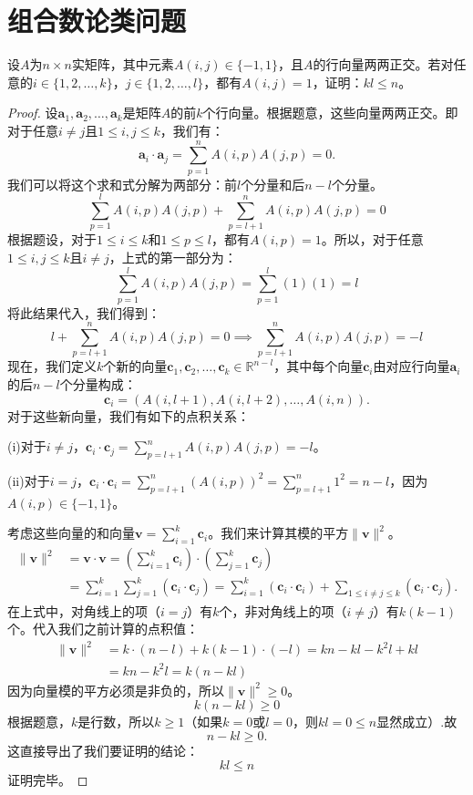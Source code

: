 \documentclass[../../main.tex]{subfiles}
\begin{document}
\section{组合数论类问题}

\begin{example}
设$A$为$n \times n$实矩阵，其中元素$A(i,j) \in \{-1,1\}$，且$A$的行向量两两正交。若对任意的$i \in \{1,2,\ldots,k\}$，$j \in \{1,2,\ldots,l\}$，都有$A(i,j) = 1$，证明：$kl \leqslant n$。
\end{example}
\begin{proof}
设$\mathbf{a}_1, \mathbf{a}_2, \ldots, \mathbf{a}_k$是矩阵$A$的前$k$个行向量。根据题意，这些向量两两正交。即对于任意$i \neq j$且$1 \leq i, j \leq k$，我们有：
\[
\mathbf{a}_i \cdot \mathbf{a}_j = \sum_{p=1}^n A(i, p)A(j, p) = 0.
\]
我们可以将这个求和式分解为两部分：前$l$个分量和后$n - l$个分量。
\[
\sum_{p=1}^l A(i, p)A(j, p) + \sum_{p=l+1}^n A(i, p)A(j, p) = 0 
\]
根据题设，对于$1 \leq i \leq k$和$1 \leq p \leq l$，都有$A(i, p) = 1$。所以，对于任意$1 \leq i, j \leq k$且$i \neq j$，上式的第一部分为：
\[
\sum_{p=1}^l A(i, p)A(j, p) = \sum_{p=1}^l (1)(1) = l 
\]
将此结果代入，我们得到：
\[
l + \sum_{p=l+1}^n A(i, p)A(j, p) = 0 \implies \sum_{p=l+1}^n A(i, p)A(j, p) = -l 
\]
现在，我们定义$k$个新的向量$\mathbf{c}_1, \mathbf{c}_2, \ldots, \mathbf{c}_k \in \mathbb{R}^{n - l}$，其中每个向量$\mathbf{c}_i$由对应行向量$\mathbf{a}_i$的后$n - l$个分量构成：
\[
\mathbf{c}_i = (A(i, l + 1), A(i, l + 2), \ldots, A(i, n)).
\]
对于这些新向量，我们有如下的点积关系：

(i)对于$i \neq j$，$\mathbf{c}_i \cdot \mathbf{c}_j = \sum_{p=l+1}^n A(i, p)A(j, p) = -l$。

(ii)对于$i = j$，$\mathbf{c}_i \cdot \mathbf{c}_i = \sum_{p=l+1}^n (A(i, p))^2 = \sum_{p=l+1}^n 1^2 = n - l$，因为$A(i, p) \in \{-1, 1\}$。

考虑这些向量的和向量$\mathbf{v} = \sum_{i=1}^k \mathbf{c}_i$。我们来计算其模的平方$\|\mathbf{v}\|^2$。
\begin{align*}
\|\mathbf{v}\|^2 &= \mathbf{v} \cdot \mathbf{v} = \left( \sum_{i=1}^k \mathbf{c}_i \right) \cdot \left( \sum_{j=1}^k \mathbf{c}_j \right) \\
&= \sum_{i=1}^k \sum_{j=1}^k (\mathbf{c}_i \cdot \mathbf{c}_j)= \sum_{i=1}^k (\mathbf{c}_i \cdot \mathbf{c}_i) + \sum_{1 \leq i \neq j \leq k} (\mathbf{c}_i \cdot \mathbf{c}_j).
\end{align*}
在上式中，对角线上的项（$i = j$）有$k$个，非对角线上的项（$i \neq j$）有$k(k - 1)$个。代入我们之前计算的点积值：
\begin{align*}
\|\mathbf{v}\|^2 &= k \cdot (n - l) + k(k - 1) \cdot (-l) = kn - kl - k^2 l + kl \\
&= kn - k^2 l = k(n - kl)
\end{align*}
因为向量模的平方必须是非负的，所以$\|\mathbf{v}\|^2 \geq 0$。
\[
k(n - kl) \geqslant 0
\]
根据题意，$k$是行数，所以$k \geq 1$（如果$k = 0$或$l = 0$，则$kl = 0 \leq n$显然成立）.故
\[
n - kl \geqslant 0.
\]
这直接导出了我们要证明的结论：
\[
kl \leq n \label{eq:12}
\]
证明完毕。

\end{proof}
\end{document}
